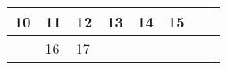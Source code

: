 {\begin{tabularx}{\linewidth}{|l!{\vrule width \myLenLineThicknessThick}*{7}{@{}X@{}|}}
      
      
        \begin{minipage}[t]{6mm}\centering{}10\end{minipage}
      
       & 
    
      
      
        \begin{minipage}[t]{6mm}\centering{}11\end{minipage}
      
       & 
    
      
      
        \begin{minipage}[t]{6mm}\centering{}12\end{minipage}
      
       & 
    
      
      
        \begin{minipage}[t]{6mm}\centering{}13\end{minipage}
      
       & 
    
      
      
        \begin{minipage}[t]{6mm}\centering{}14\end{minipage}
      
       & 
    
      
      
        \begin{minipage}[t]{6mm}\centering{}15\end{minipage}
      
      
        \\  \hline 
      
    
  
  
  
  \hyperlink{week-2026-11}{} &
    
      
      
        \begin{minipage}[t]{6mm}\centering{}16\end{minipage}
      
       & 
    
      
      
        \begin{minipage}[t]{6mm}\centering{}17\end{minipage}
      

\end{tabularx}}
